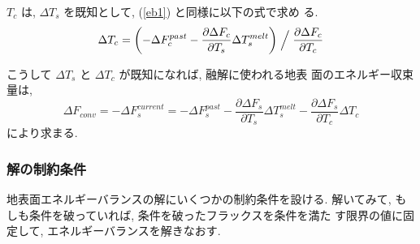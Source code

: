 $T_c$ は, $\Delta T_s$ を既知として, (\ref{eb1}) と同様に以下の式で求め
る. 
\begin{equation}
 \Delta T_c = \left( - \Delta F_c^{past} 
            - \frac{\partial \Delta F_c}{\partial T_s} \Delta T_s^{melt}
              \right) \Bigm/ \frac{\partial \Delta F_c}{\partial T_c}
\end{equation}

こうして $\Delta T_s$ と $\Delta T_c$ が既知になれば, 融解に使われる地表
面のエネルギー収束量は, 
\begin{equation}
 \Delta F_{conv} =
 - \Delta F_s^{current} = - \Delta F_s^{past} 
 - \frac{\partial \Delta F_s}{\partial T_s} \Delta T_s^{melt}
 - \frac{\partial \Delta F_s}{\partial T_c} \Delta T_c
\end{equation}
により求まる. 

\subsubsection{解の制約条件}

地表面エネルギーバランスの解にいくつかの制約条件を設ける. 
解いてみて, もしも条件を破っていれば, 条件を破ったフラックスを条件を満た
す限界の値に固定して, エネルギーバランスを解きなおす. 

